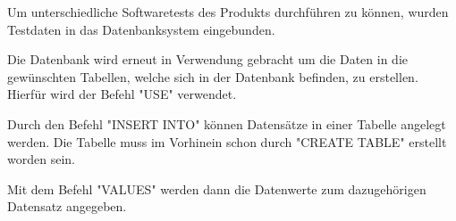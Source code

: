 
Um unterschiedliche Softwaretests des Produkts durchführen zu können, wurden Testdaten in das Datenbanksystem eingebunden.


Die Datenbank wird erneut in Verwendung gebracht um die Daten in die gewünschten Tabellen, welche sich in der Datenbank befinden, zu erstellen. Hierfür wird der Befehl "USE" verwendet.


Durch den Befehl "INSERT INTO" können Datensätze in einer Tabelle angelegt werden. Die Tabelle muss im Vorhinein schon durch "CREATE TABLE" erstellt worden sein.


Mit dem Befehl "VALUES" werden dann die Datenwerte zum dazugehörigen Datensatz angegeben.

